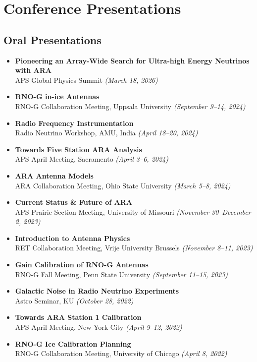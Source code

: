 \documentclass[10pt]{report}
\begin{document}
\section*{Conference Presentations}
\subsection*{Oral Presentations}
\begin{itemize}

    \item \textbf{Pioneering an Array-Wide Search for Ultra-high Energy Neutrinos with ARA} \\
    APS Global Physics Summit \textit{(March 18, 2026)}

    \item \textbf{RNO-G in-ice Antennas} \\
    RNO-G Collaboration Meeting, Uppsala University \textit{(September 9--14, 2024)}
    
    \item \textbf{Radio Frequency Instrumentation} \\
    Radio Neutrino Workshop, AMU, India \textit{(April 18--20, 2024)}
    
    \item \textbf{Towards Five Station ARA Analysis} \\
    APS April Meeting, Sacramento \textit{(April 3--6, 2024)}
    
    \item \textbf{ARA Antenna Models} \\
    ARA Collaboration Meeting, Ohio State University \textit{(March 5--8, 2024)}
    
    \item \textbf{Current Status \& Future of ARA} \\
    APS Prairie Section Meeting, University of Missouri \textit{(November 30--December 2, 2023)}
    
    \item \textbf{Introduction to Antenna Physics} \\
    RET Collaboration Meeting, Vrije University Brussels \textit{(November 8--11, 2023)}
    
    \item \textbf{Gain Calibration of RNO-G Antennas} \\
    RNO-G Fall Meeting, Penn State University \textit{(September 11--15, 2023)}

    \item \textbf{Galactic Noise in Radio Neutrino Experiments} \\
    Astro Seminar, KU \textit{(October 28, 2022)}
    
    \item \textbf{Towards ARA Station 1 Calibration} \\
    APS April Meeting, New York City \textit{(April 9--12, 2022)}
    
    \item \textbf{RNO-G Ice Calibration Planning} \\
    RNO-G Collaboration Meeting, University of Chicago \textit{(April 8, 2022)}
\end{itemize}
\end{document}
